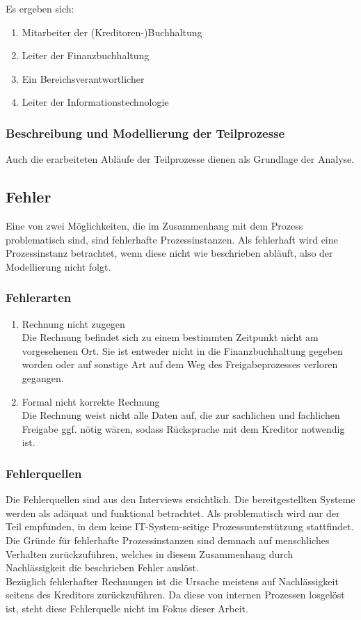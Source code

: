 Es ergeben sich:

\begin{enumerate}
\item{Mitarbeiter der (Kreditoren-)Buchhaltung}
\item{Leiter der Finanzbuchhaltung}
\item{Ein Bereichsverantwortlicher}
\item{Leiter der Informationstechnologie}
\end{enumerate}


\subsubsection{Beschreibung und Modellierung der Teilprozesse}

Auch die erarbeiteten Abläufe der Teilprozesse dienen als Grundlage der Analyse.


\subsection{Fehler}
Eine von zwei Möglichkeiten, die im Zusammenhang mit dem Prozess problematisch sind, sind fehlerhafte Prozessinstanzen. Als fehlerhaft wird eine Prozessinstanz betrachtet, wenn diese nicht wie beschrieben abläuft, also der Modellierung nicht folgt.
\subsubsection{Fehlerarten}

\begin{enumerate}
\item{Rechnung nicht zugegen}
\\ Die Rechnung befindet sich zu einem bestimmten Zeitpunkt nicht am vorgesehenen Ort. 
Sie ist entweder nicht in die Finanzbuchhaltung gegeben worden oder auf sonstige Art auf dem Weg des Freigabeprozesses verloren gegangen.
\item{Formal nicht korrekte Rechnung}
\\ Die Rechnung weist nicht alle Daten auf, die zur sachlichen und fachlichen Freigabe ggf. nötig wären, sodass Rücksprache mit dem Kreditor notwendig ist.
\end{enumerate}


\subsubsection{Fehlerquellen}

Die Fehlerquellen sind aus den Interviews ersichtlich. 
Die bereitgestellten Systeme werden als adäquat und funktional betrachtet.
Als problematisch wird nur der Teil empfunden, in dem keine IT-System-seitige Prozessunterstützung stattfindet.
Die Gründe für fehlerhafte Prozessinstanzen sind demnach auf menschliches Verhalten zurückzuführen, welches in diesem Zusammenhang durch Nachlässigkeit die beschrieben Fehler auslöst.
\\
Bezüglich fehlerhafter Rechnungen ist die Ursache meistens auf Nachlässigkeit seitens des Kreditors zurückzuführen.
Da diese von internen Prozessen losgelöst ist, steht diese Fehlerquelle nicht im Fokus dieser Arbeit. 

